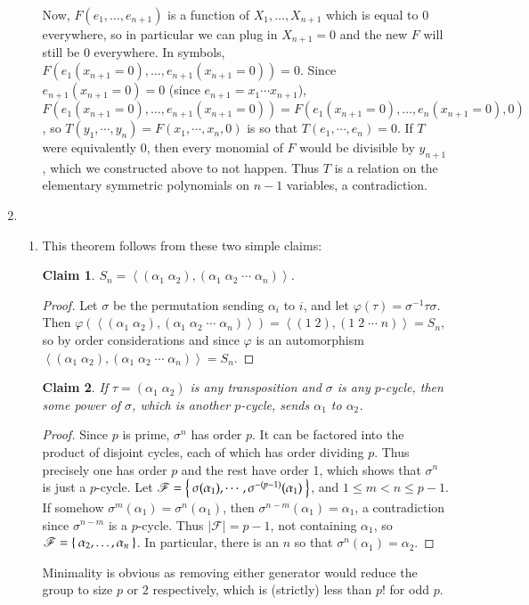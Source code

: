 \documentclass[12pt]{article}
\theoremstyle{definitionstyle}
\newtheorem*{claim}{Claim}
\def \cph{\varphi}
\newcommand{\gen}[1]{\left\langle #1 \right\rangle}
\begin{document}
\begin{enumerate}[leftmargin=\labelsep]
\begin{enumerate}
		 Now, $F(e_1, \ldots, e_{n+1})$ is a function of $X_1, \ldots, X_{n+1}$ which is equal to 0 everywhere, so in particular we can plug in $X_{n+1} = 0$ and the new $F$ will still be 0 everywhere. In symbols, $F(e_1(x_{n+1}=0), \ldots, e_{n+1}(x_{n+1}=0)) = 0$. Since $e_{n+1}(x_{n+1}=0) = 0$ (since $e_{n+1} = x_1 \cdots x_{n+1}$), $F(e_1(x_{n+1}=0), \ldots, e_{n+1}(x_{n+1}=0)) = F(e_1(x_{n+1}=0), \ldots, e_n(x_{n+1}=0), 0)$, so $T(y_1, \cdots, y_n) = F(x_1, \cdots, x_n, 0)$ is so that $T(e_1, \cdots, e_n) = 0$. If $T$ were equivalently 0, then every monomial of $F$ would be divisible by $y_{n+1}$, which we constructed above to not happen. Thus $T$ is a relation on the elementary symmetric polynomials on $n-1$ variables, a contradiction.
		\end{enumerate}
	
		\item 
		\begin{enumerate}
			\item This theorem follows from these two simple claims:
			
			\begin{claim}
				$S_n = \gen{(\alpha_1 \; \alpha_2), (\alpha_1 \; \alpha_2 \; \cdots \; \alpha_n)}$. 
			\end{claim}
			\begin{proof}
				Let $\sigma$ be the permutation sending $\alpha_i$ to $i$, and let $\cph(\tau) = \sigma^{-1} \tau \sigma$. Then $\cph(\gen{(\alpha_1 \; \alpha_2), (\alpha_1 \; \alpha_2 \; \cdots \; \alpha_n)}) = \gen{(1 \; 2), (1 \; 2 \; \cdots \; n)} = S_n$, so by order considerations and since $\cph$ is an automorphism $\gen{(\alpha_1 \; \alpha_2), (\alpha_1 \; \alpha_2 \; \cdots \; \alpha_n)} = S_n$.
			\end{proof}
		
			\begin{claim}
				If $\tau = (\alpha_1 \; \alpha_2)$ is any transposition and $\sigma$ is any $p$-cycle, then some power of $\sigma$, which is another $p$-cycle, sends $\alpha_1$ to $\alpha_2$.
			\end{claim}
			\begin{proof}
				Since $p$ is prime, $\sigma^n$ has order $p$. It can be factored into the product of disjoint cycles, each of which has order dividing $p$. Thus precisely one has order $p$ and the rest have order 1, which shows that $\sigma^n$ is just a $p$-cycle. Let $\mathscr{F} = \Set{\sigma(\alpha_1), \cdots, \sigma^{-(p-1)}(\alpha_1)}$, and $1 \leq m < n \leq p-1$. If somehow $\sigma^{m}(\alpha_1) = \sigma^{n}(\alpha_1)$, then $\sigma^{n-m}(\alpha_1) = \alpha_1$, a contradiction since $\sigma^{n-m}$ is a $p$-cycle. Thus $|\mathscr{F}| = p-1$, not containing $\alpha_1$, so $\mathscr{F} = \Set{\alpha_2, \ldots, \alpha_n}$. In particular, there is an $n$ so that $\sigma^{n}(\alpha_1) = \alpha_2$.
			\end{proof}
			Minimality is obvious as removing either generator would reduce the group to size $p$ or $2$ respectively, which is (strictly) less than $p!$ for odd $p$.
			

\end{enumerate}
\end{enumerate}
\end{document}
